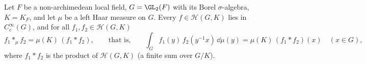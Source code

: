 Let $F$ be a non-archimedean local field, $G=\GL_2(F)$ with its Borel $\sigma$-algebra, $K=K_F$, and let $\mu$ be a
left Haar measure on $G$. Every $f\in\mathcal H(G,K)$ lies in $C_c^\infty(G)$, and for all
$f_1,f_2\in\mathcal H(G,K)$
\[
  f_1*_\mu f_2=\mu(K)\,(f_1*f_2),\qquad\text{that is,}\qquad
  \int_Gf_1(y)\,f_2(y^{-1}x)\,\dd\mu(y)=\mu(K)\,(f_1*f_2)(x)\quad(x\in G),
\]
where $f_1*f_2$ is the product of $\mathcal H(G,K)$ (a finite sum over $G/K$).

